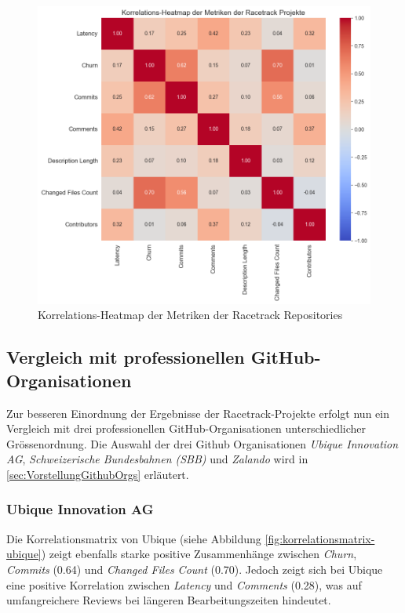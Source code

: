 \begin{figure}[htbp]
    \includegraphics[width=\textwidth]{Figures/racetrack-korrelationsmatrix.png}
    \caption{Korrelations-Heatmap der Metriken der Racetrack Repositories}
    \label{fig:korrelationsmatrix-racetrack}
\end{figure}



\subsection{Vergleich mit professionellen GitHub-Organisationen}
Zur besseren Einordnung der Ergebnisse der Racetrack-Projekte erfolgt nun ein Vergleich mit drei professionellen GitHub-Organisationen unterschiedlicher Grössenordnung. Die Auswahl der drei Github Organisationen \textit{Ubique Innovation AG}, \textit{Schweizerische Bundesbahnen (SBB)} und \textit{Zalando} wird in \autoref{sec:VorstellungGithubOrgs} erläutert. 


\subsubsection{Ubique Innovation AG}
Die Korrelationsmatrix von Ubique (siehe Abbildung \autoref{fig:korrelationsmatrix-ubique}) zeigt ebenfalls starke positive Zusammenhänge zwischen \textit{Churn}, \textit{Commits} (0.64) und \textit{Changed Files Count} (0.70). Jedoch zeigt sich bei Ubique eine positive Korrelation zwischen \textit{Latency} und \textit{Comments} (0.28), was auf umfangreichere Reviews bei längeren Bearbeitungszeiten hindeutet.

